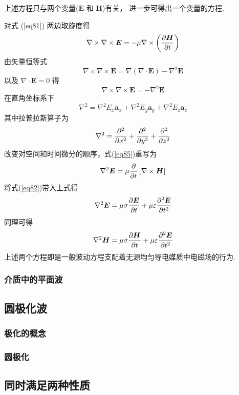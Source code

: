 \documentclass[UTF8,linespread=1.236]{ctexart}
\newcommand\myref[1]{(\ref{#1})}
\newcommand\cu[1]{\boldsymbol{#1}}
\newcommand\vecE{\cu{E}}
\newcommand\vecH{\cu{H}}
\newcommand\pypx[2]{{{\partial {#1}} \over {\partial {#2}}}}
\begin{document}
上述方程只与两个变量($\vecE$ 和 $\vecH$)有关，
进一步可得出一个变量的方程.

对式 \myref{eq81} 两边取旋度得
\begin{equation}\label{eq85}
    \nabla \times \nabla \times \vecE
    =
    - \mu \nabla \times \left( \pypx{\vecH}{t} \right)
\end{equation}
由矢量恒等式
\begin{equation}
    \nabla \times \nabla \times \vecE
    =
    \nabla(\nabla \cdot \vecE)
    -
    \nabla^2\vecE
\end{equation}
以及 $\nabla \cdot \vecE = 0$ 得
\begin{equation}
    \nabla \times \nabla \times \vecE = - \nabla^2\vecE
\end{equation}
在直角坐标系下
\begin{equation}
    \nabla^2 =
    \nabla^2E_x\cu{a}_x +
    \nabla^2E_y\cu{a}_y +
    \nabla^2E_z\cu{a}_z
\end{equation}
其中拉普拉斯算子为
\begin{equation}
    \nabla^2 = \pypx{^2}{x^2} + \pypx{^2}{y^2} + \pypx{^2}{z^2}
\end{equation}
改变对空间和时间微分的顺序，式\myref{eq85}重写为
\begin{equation*}
    \nabla^2\vecE = \mu \pypx{}{t}\left[ \nabla \times \vecH \right]
\end{equation*}
将式\myref{eq82}带入上式得
\begin{equation}
    \nabla^2\vecE = 
    \mu \sigma \pypx{\vecE}{t} + \mu \varepsilon \pypx{^2\vecE}{t^2}
\end{equation}
同理可得
\begin{equation}
    \nabla^2\vecH = 
    \mu \sigma \pypx{\vecH}{t} + \mu \varepsilon \pypx{^2\vecE}{t^2}
\end{equation}
上述两个方程即是一般波动方程支配着无源均匀导电媒质中电磁场的行为.

\subsubsection{介质中的平面波}

\subsection{圆极化波}

\subsubsection{极化的概念}

\subsubsection{圆极化}

\subsection{同时满足两种性质}


\end{document}
